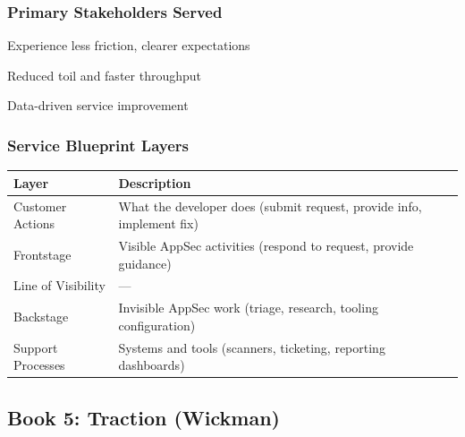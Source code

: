 \documentclass[11pt,letterpaper]{article}
\begin{document}
\subsubsection{Primary Stakeholders Served}

\begin{stakeholderbox}
\begin{description}[nosep, leftmargin=3cm]
    \item[Developers] Experience less friction, clearer expectations
    \item[Eng Productivity] Reduced toil and faster throughput
    \item[AppSec Leadership] Data-driven service improvement
\end{description}
\end{stakeholderbox}

\subsubsection{Service Blueprint Layers}

\begin{center}
\renewcommand{\arraystretch}{1.4}
\begin{tabular}{p{3.5cm}p{9.5cm}}
\toprule
\textbf{Layer} & \textbf{Description} \\
\midrule
Customer Actions & What the developer does (submit request, provide info, implement fix) \\
Frontstage & Visible AppSec activities (respond to request, provide guidance) \\
Line of Visibility & --- \\
Backstage & Invisible AppSec work (triage, research, tooling configuration) \\
Support Processes & Systems and tools (scanners, ticketing, reporting dashboards) \\
\bottomrule
\end{tabular}
\end{center}

\newpage

\subsection{Book 5: Traction (Wickman)}
\end{document}
